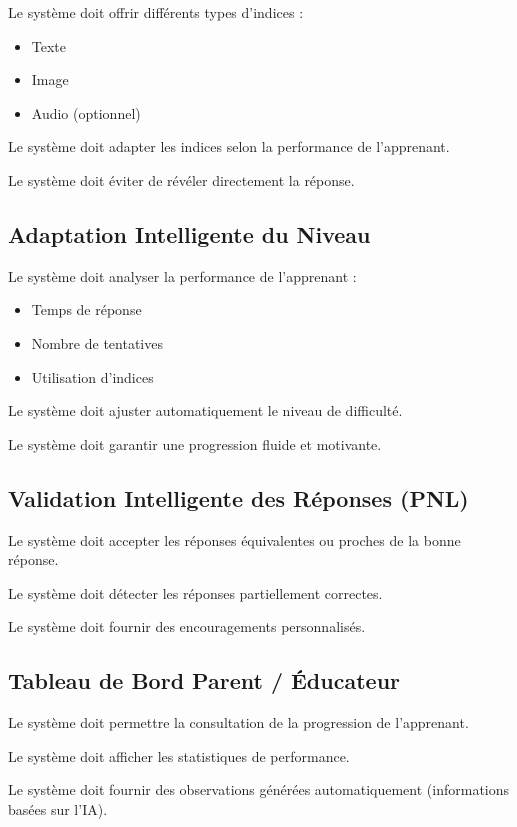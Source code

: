 \documentclass[12pt,a4paper]{article}
\begin{document}
Le système doit offrir différents types d'indices :
\begin{itemize}
    \item Texte
    \item Image
    \item Audio (optionnel)
\end{itemize}

Le système doit adapter les indices selon la performance de l'apprenant.

Le système doit éviter de révéler directement la réponse.

\subsection{Adaptation Intelligente du Niveau}

Le système doit analyser la performance de l'apprenant :
\begin{itemize}
    \item Temps de réponse
    \item Nombre de tentatives
    \item Utilisation d'indices
\end{itemize}

Le système doit ajuster automatiquement le niveau de difficulté.

Le système doit garantir une progression fluide et motivante.

\subsection{Validation Intelligente des Réponses (PNL)}

Le système doit accepter les réponses équivalentes ou proches de la bonne réponse.

Le système doit détecter les réponses partiellement correctes.

Le système doit fournir des encouragements personnalisés.

\subsection{Tableau de Bord Parent / Éducateur}

Le système doit permettre la consultation de la progression de l'apprenant.

Le système doit afficher les statistiques de performance.

Le système doit fournir des observations générées automatiquement (informations basées sur l'IA).
\end{document}
